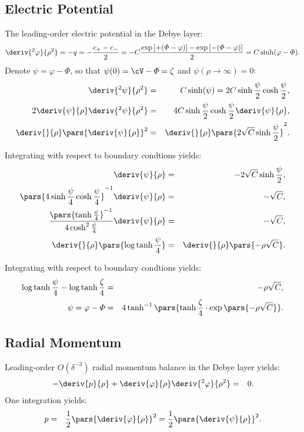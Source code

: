 \subsection{Electric Potential}
The leading-order electric potential in the Debye layer:
\begin{eqnarray}  
\deriv{^2 \varphi}{\rho^2} = -q = -\frac{c_+ - c_-}{2} = 
-C\frac{\exp\left[+(\varPhi - \varphi)\right] - \exp\left[-(\varPhi - \varphi)\right]}{2} = 
C \sinh(\varphi - \varPhi).
\end{eqnarray}
Denote $\psi = \varphi - \varPhi$, so that $\psi(0) = \cV - \varPhi = \zeta$ and 
$\psi(\rho\rightarrow\infty) = 0$:
\begin{eqnarray}  
\deriv{^2 \psi}{\rho^2} &=& C \sinh(\psi) = 2 C \sinh{\frac{\psi}{2}}\cosh{\frac{\psi}{2}} ,
\\
2\deriv{\psi}{\rho} \deriv{^2 \psi}{\rho^2} &=& 
4 C \sinh{\frac{\psi}{2}}\cosh{\frac{\psi}{2}} \deriv{\psi}{\rho} ,
\\
\deriv{}{\rho} \pars{\deriv{\psi}{\rho}}^2 &=& 
\deriv{}{\rho} \pars{2 \sqrt{C} \sinh{\frac{\psi}{2}}}^2 .
\end{eqnarray}

Integrating with respect to boundary condtions yields:
\begin{eqnarray}  
\deriv{\psi}{\rho} &=& -2\sqrt{C}\sinh\frac{\psi}{2}, \\  
\pars{4\sinh\frac{\psi}{4}\cosh\frac{\psi}{4}}^{-1}\deriv{\psi}{\rho} &=& -\sqrt{C}, \\  
\frac{\pars{\tanh\frac{\psi}{4}}^{-1}}{4\cosh^2\frac{\psi}{4}}
\deriv{\psi}{\rho} &=& -\sqrt{C}, \\  
\deriv{}{\rho}\pars{\log\tanh\frac{\psi}{4}} &=& \deriv{}{\rho}\pars{-\rho \sqrt{C}} .
\end{eqnarray}

Integrating with respect to boundary condtions yields:
\begin{eqnarray}
\log\tanh\frac{\psi}{4} - \log\tanh\frac{\zeta}{4} &=& -\rho \sqrt{C}, \\
\psi = \varphi - \varPhi &=& 
4 \tanh^{-1}\pars{\tanh{\frac{\zeta}{4}} \cdot \exp\pars{-\rho \sqrt{C}}}.
\end{eqnarray}

\subsection{Radial Momentum}
Leading-order $O(\delta^{-3})$ radial momentum balance in the Debye layer yields:
\begin{eqnarray} 
- \deriv{p}{\rho} + \deriv{\varphi}{\rho} \deriv{^2\varphi}{\rho^2} &=& 0.
\end{eqnarray}
One integration yields:
\begin{eqnarray} 
p &=& \frac{1}{2}\pars{\deriv{\varphi}{\rho}}^2 = \frac{1}{2}\pars{\deriv{\psi}{\rho}}^2.
\end{eqnarray}

